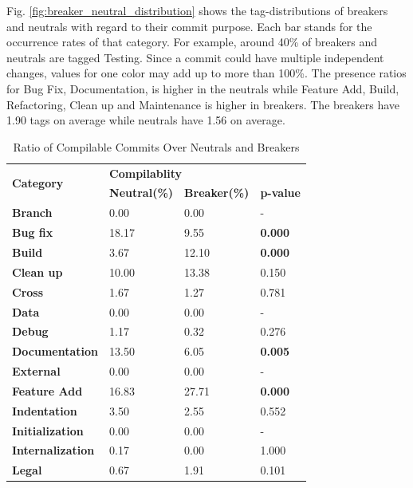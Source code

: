 Fig. \ref{fig:breaker_neutral_distribution} shows the tag-distributions of breaker{}s and neutral{}s with regard to their commit purpose.
Each bar stands for the occurrence rates of that category. 
For example, around 40\% of breaker{}s and neutral{}s are tagged Testing. 
Since a commit could have multiple independent changes, values for one color may add up to more than 100\%.
The presence ratios for Bug Fix, Documentation, is higher in the neutrals while Feature Add, Build, Refactoring, Clean up and Maintenance is higher in breaker{}s.
The breaker{}s have 1.90 tags on average while neutral{}s have 1.56 on average.


\begin{table}[htbp]
    \centering
    \caption{Ratio of Compilable Commits Over Neutrals and Breakers}
      \begin{tabular}{llll}
      \hline
      \multirow{2}[4]{*}{\textbf{Category}} & \multicolumn{3}{l}{\textbf{Compilablity}} \\          & \textbf{Neutral(\%)} & \textbf{Breaker(\%)} & \textbf{p-value} \\
      \hline
      \textbf{Branch} & 0.00  & 0.00  & - \\
      \hline
      \textbf{Bug fix} & 18.17  & 9.55  & \textbf{0.000} \\
      \hline
      \textbf{Build} & 3.67  & 12.10  & \textbf{0.000} \\
      \hline
      \textbf{Clean up} & 10.00  & 13.38  & 0.150  \\
      \hline
      \textbf{Cross} & 1.67  & 1.27  & 0.781  \\
      \hline
      \textbf{Data} & 0.00  & 0.00  & - \\
      \hline
      \textbf{Debug} & 1.17  & 0.32  & 0.276  \\
      \hline
      \textbf{Documentation} & 13.50  & 6.05  & \textbf{0.005} \\
      \hline
      \textbf{External} & 0.00  & 0.00  & - \\
      \hline
      \textbf{Feature Add} & 16.83  & 27.71  & \textbf{0.000} \\
      \hline
      \textbf{Indentation} & 3.50  & 2.55  & 0.552  \\
      \hline
      \textbf{Initialization} & 0.00  & 0.00  & - \\
      \hline
      \textbf{Internalization} & 0.17  & 0.00  & 1.000  \\
      \hline
      \textbf{Legal} & 0.67  & 1.91  & 0.101  \\

\end{tabular}
\end{table}
